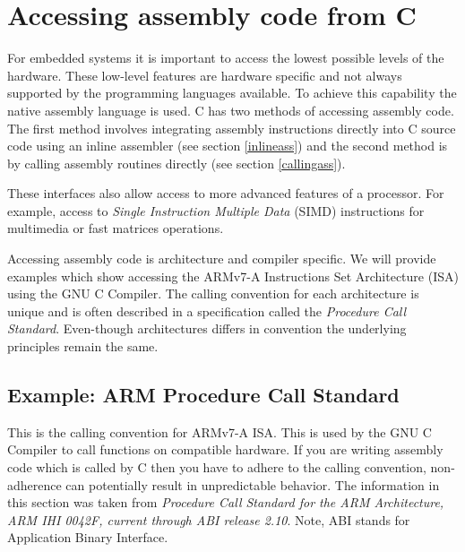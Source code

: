 \section{Accessing assembly code from C} \label{assembler} 

For embedded systems it is important to access the lowest possible levels of the hardware. These low-level features are hardware specific and not always supported by the programming languages available. To achieve this capability the native assembly language is used. C has two methods of accessing assembly code. The first method involves integrating assembly instructions directly into C source code using an inline assembler (see section \ref{inlineass}) and the second method is by calling assembly routines directly (see section \ref{callingass}). 

These interfaces also allow access to more advanced features of a processor. For example, access to \textit{Single Instruction Multiple Data} (SIMD) instructions for multimedia or fast matrices operations.

Accessing assembly code is architecture and compiler specific. We will provide examples which show accessing the ARMv7-A Instructions Set Architecture (ISA) using the GNU C Compiler. The calling convention for each architecture is unique and is often described in a specification called the \textit{Procedure Call Standard}. Even-though architectures differs in convention the underlying principles remain the same. 


\subsection{Example: ARM Procedure Call Standard} \label{apcs}

This is the calling convention for ARMv7-A ISA. This is used by the GNU C Compiler to call functions on compatible hardware. If you are writing assembly code which is called by C then you have to adhere to the calling convention, non-adherence can potentially result in unpredictable behavior. The information in this section was taken from \textit{Procedure Call Standard for the ARM Architecture, ARM IHI 0042F, current through ABI release 2.10}. Note, ABI stands for Application Binary Interface. 


